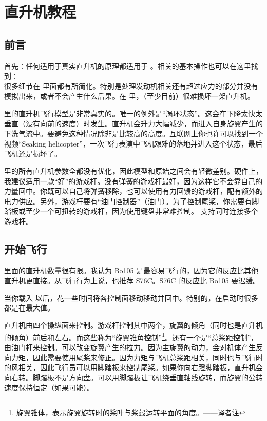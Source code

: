 \ifchinese
\chapter{直升机教程}
\label{helicopter}

\section{前言}

首先：任何适用于真实直升机的原理都适用于 \FlightGear。相关的基本操作也可以在这里找到：\\ 很多细节在 \FlightGear 里面都有所简化。特别是处理发动机相关还有超过应力的部分并没有模拟出来，或者不会产生什么后果。在 \FlightGear 里，（至少目前）很难损坏一架直升机。


\FlightGear 里的直升机飞行模型是非常真实的。唯一的例外是“涡环状态”。这会在下降太快太垂直（没有向前的速度）时发生。直升机会升力大幅减少，而进入自身旋翼产生的下洗气流中。要避免这种情况除非是比较高的高度。互联网上你也许可以找到一个视频“Seaking helicopter”，一次飞行表演中飞机艰难的落地并进入这个状态，最后飞机还是损坏了。

\FlightGear 里的所有直升机参数全都没有优化，因此模型和原始之间会有轻微差别。硬件上，我建议适用一款“好”的游戏杆。没有弹簧的游戏杆最好，因为这样它不会靠自己的力量回中。你既可以自己将弹簧移除，也可以使用有力回馈的游戏杆，配有额外的电力供应。另外，游戏杆要有“油门控制器”（油门）。为了控制尾桨，你需要有脚踏板或至少一个可扭转的游戏杆，因为使用键盘非常难控制。\FlightGear{} 支持同时连接多个游戏杆。

\section{开始飞行}

\FlightGear{} 里面的直升机数量很有限。我认为 Bo105 是最容易飞行的，因为它的反应比其他直升机更直接。从飞行行为上说，也推荐 S76C。S76C 的反应比 Bo105 要迟缓。

当你载入 \FlightGear 以后，花一些时间将各控制面移动移动并回中。特别的，在启动时很多都是在最大值。


直升机由四个操纵面来控制。游戏杆控制其中两个，旋翼的倾角（同时也是直升机的倾角）前后和左右。而这些称为“旋翼锥角控制”\footnote{旋翼锥体，表示旋翼旋转时的桨叶与桨毂运转平面的角度。——译者注}。还有一个是“总桨距控制”，由油门杆来控制。可以改变旋翼产生的拉力。因为主旋翼的动力，会对机体产生反向力矩，因此需要使用尾桨来修正。因为力矩与飞机总桨距相关，同时也与飞行时的风相关，因此飞行员可以用脚踏板来控制尾桨。如果你向右蹬脚踏板，直升机会向右转。脚踏板不是方向盘。可以用脚踏板让飞机绕垂直轴线旋转，而旋翼的公转速度保持恒定（如果可能）。

